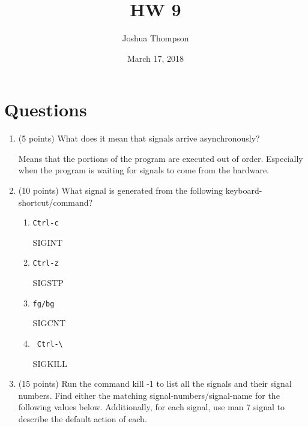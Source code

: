 \documentclass{article}[9pt]
\title{HW 9}
\author{Joshua Thompson}
\date{March 17, 2018}
\newenvironment{answerfont}{\fontfamily{qhv}\selectfont}{\par}
\newenvironment{myanswer}{\begin{mdframed}\begin{answerfont}}{\end{answerfont}\end{mdframed}}
\begin{document}
\maketitle
\section*{Questions}
\label{sec:org3ac93b9}

\begin{enumerate}
\item (5 points) What does it mean that signals arrive asynchronously?

\begin{myanswer}
Means that the portions of the program are executed out of order. Especially when the program is waiting for signals to come from the hardware.
\end{myanswer}


\item (10 points) What signal is generated from the following keyboard-shortcut/command?

\begin{enumerate}
\item \texttt{Ctrl-c}

  \begin{myanswer}
  SIGINT
  \end{myanswer}


\item \texttt{Ctrl-z}

  \begin{myanswer}
  SIGSTP
  \end{myanswer}

\item \texttt{fg/bg}

  \begin{myanswer}
  SIGCNT
  \end{myanswer}

\item \begin{verbatim} Ctrl-\ \end{verbatim}

  \begin{myanswer}
  SIGKILL
  \end{myanswer}
\end{enumerate}

\item (15 points) Run the command kill -1 to list all the signals and their signal numbers. Find either the matching signal-numbers/signal-name for the following
values below. Additionally, for each signal, use man 7 signal to describe the default action of each.


\end{enumerate}
\end{document}
